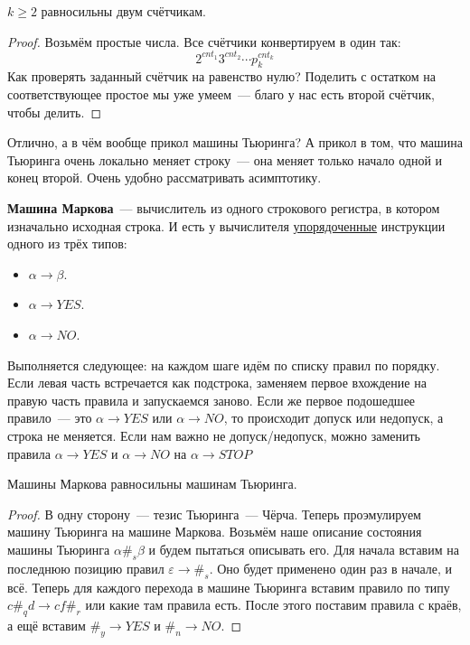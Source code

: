 \documentclass{article}
\begin{document}
    \begin{claim}
        $k\geqslant2$ равносильны двум счётчикам.
    \end{claim}
    \begin{proof}
        Возьмём простые числа. Все счётчики конвертируем в один так:
        $$
        2^{cnt_1}3^{cnt_2}\cdots p_k^{cnt_k}
        $$
        Как проверять заданный счётчик на равенство нулю? Поделить с остатком на соответствующее простое мы уже умеем~--- благо у нас есть второй счётчик, чтобы делить.
    \end{proof}
    \begin{remark}
        Отлично, а в чём вообще прикол машины Тьюринга? А прикол в том, что машина Тьюринга очень локально меняет строку~--- она меняет только начало одной и конец второй. Очень удобно рассматривать асимптотику.
    \end{remark}
    \begin{definition}
        \textbf{Машина Маркова}~--- вычислитель из одного строкового регистра, в котором изначально исходная строка. И есть у вычислителя \underline{упорядоченные} инструкции одного из трёх типов:
        \begin{itemize}
            \item $\alpha\to\beta$.
            \item $\alpha\to YES$.
            \item $\alpha\to NO$.
        \end{itemize}
        Выполняется следующее: на каждом шаге идём по списку правил по порядку. Если левая часть встречается как подстрока, заменяем первое вхождение на правую часть правила и запускаемся заново. Если же первое подошедшее правило~--- это $\alpha\to YES$ или $\alpha\to NO$, то происходит допуск или недопуск, а строка не меняется. Если нам важно не допуск/недопуск, можно заменить правила $\alpha\to YES$ и $\alpha\to NO$ на $\alpha\to STOP$
    \end{definition}
    \begin{claim}
        Машины Маркова равносильны машинам Тьюринга.
    \end{claim}
    \begin{proof}
        В одну сторону~--- тезис Тьюринга~--- Чёрча. Теперь проэмулируем машину Тьюринга на машине Маркова. Возьмём наше описание состояния машины Тьюринга $\alpha\#_s\beta$ и будем пытаться описывать его. Для начала вставим на последнюю позицию правил $\varepsilon\to\#_s$. Оно будет применено один раз в начале, и всё. Теперь для каждого перехода в машине Тьюринга вставим правило по типу $c\#_qd\to cf\#_r$ или какие там правила есть. После этого поставим правила с краёв, а ещё вставим $\#_y\to YES$ и $\#_n\to NO$.
    \end{proof}
\end{document}

